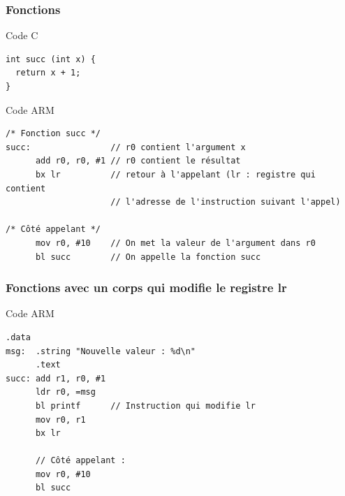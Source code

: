 \documentclass{beamer}
\begin{document}
\begin{frame}[fragile]
\frametitle{Fonctions}

\begin{block}{Code C}
{\small
\begin{lstlisting}[style=C]
int succ (int x) {
  return x + 1;
}
\end{lstlisting}}
\end{block}

\begin{block}{Code ARM}
{\small
\begin{lstlisting}[style=arm]
/* Fonction succ */
succ:                // r0 contient l'argument x
      add r0, r0, #1 // r0 contient le résultat
      bx lr          // retour à l'appelant (lr : registre qui contient
                     // l'adresse de l'instruction suivant l'appel)

/* Côté appelant */
      mov r0, #10    // On met la valeur de l'argument dans r0
      bl succ        // On appelle la fonction succ
    \end{lstlisting}}
\end{block}
\end{frame}

\begin{frame}[fragile]
\frametitle{Fonctions avec un corps qui modifie le registre lr}

\begin{block}{Code ARM}
{\small
\begin{lstlisting}[style=arm]
      .data
msg:  .string "Nouvelle valeur : %d\n"
      .text
succ: add r1, r0, #1
      ldr r0, =msg  
      bl printf      // Instruction qui modifie lr
      mov r0, r1
      bx lr     

      // Côté appelant :
      mov r0, #10
      bl succ
    \end{lstlisting}}
\end{block}

\end{frame}
\end{document}
